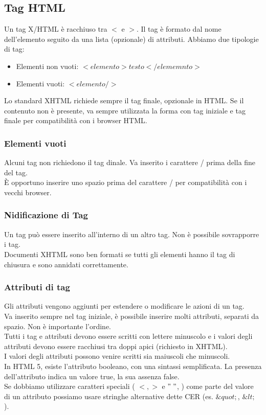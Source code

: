 \documentclass{article}
\begin{document}
\subsection{Tag HTML}
Un tag X/HTML è racchiuso tra $<$ e $>$. Il tag è formato dal nome dell'elemento seguito da una lista (opzionale) di attributi. Abbiamo due tipologie di tag:
\begin{itemize}
	\item Elementi non vuoti: $<elemento>testo</elememnto>$
	\item Elementi vuoti: $<elemento />$
\end{itemize}
Lo standard XHTML richiede sempre il tag finale, opzionale in HTML. Se il contenuto non è presente, va sempre utilizzata la forma con tag iniziale e tag finale per compatibilità con i browser HTML. 
\subsubsection{Elementi vuoti}
Alcuni tag non richiedono il tag dinale. Va inserito i carattere / prima della fine del tag.\\
È opportuno inserire uno spazio prima del carattere / per compatibilità con i vecchi browser.
\subsubsection{Nidificazione di Tag}
Un tag può essere inserito all'interno di un altro tag. Non è possibile sovrapporre i tag. \\
Documenti XHTML sono ben formati se tutti gli elementi hanno il tag di chiusura e sono annidati correttamente.
\subsubsection{Attributi di tag}
Gli attributi vengono aggiunti per estendere o modificare le azioni di un tag.\\
Va inserito sempre nel tag iniziale, è possibile inserire molti attributi, separati da spazio. Non è importante l'ordine.\\
Tutti i tag e attributi devono essere scritti con lettere minuscolo e i valori degli attributi devono essere racchiusi tra doppi apici (richiesto in XHTML).\\
I valori degli attributi possono venire scritti sia maiuscoli che minuscoli. \\
In HTML 5, esiste l'attributo booleano, con una sintassi semplificata. La presenza dell'attributo indica un valore true, la sua assenza false.\\
Se dobbiamo utilizzare caratteri speciali ( $<,>$ e $ " \; "$, ) come parte del valore di un attributo possiamo usare stringhe alternative dette CER (es. $\& quot;$, $ \& lt;$ ).
\end{document}
